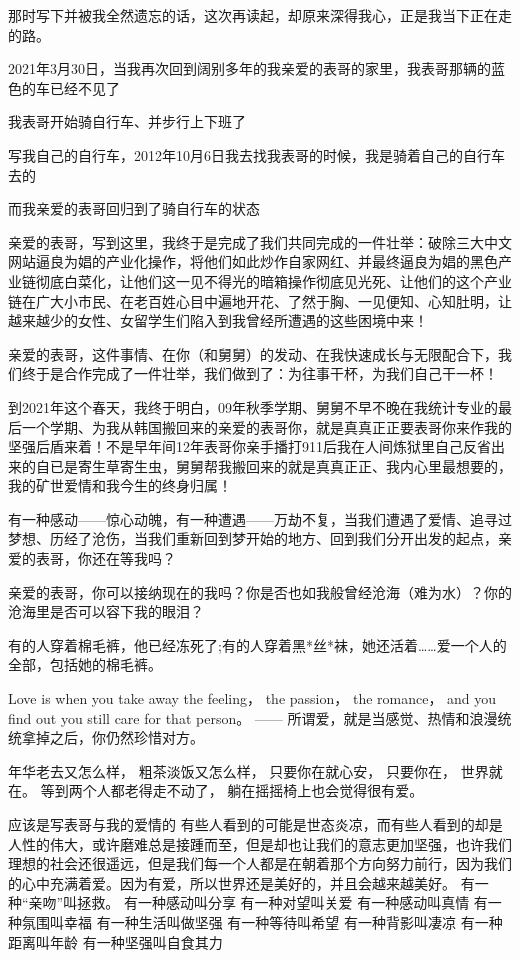 \documentclass[9pt, b5paper]{article}
\begin{document}
那时写下并被我全然遗忘的话，这次再读起，却原来深得我心，正是我当下正在走的路。 

2021年3月30日，当我再次回到阔别多年的我亲爱的表哥的家里，我表哥那辆的蓝色的车已经不见了

我表哥开始骑自行车、并步行上下班了

写我自己的自行车，2012年10月6日我去找我表哥的时候，我是骑着自己的自行车去的

而我亲爱的表哥回归到了骑自行车的状态

亲爱的表哥，写到这里，我终于是完成了我们共同完成的一件壮举：破除三大中文网站逼良为娼的产业化操作，将他们如此炒作自家网红、并最终逼良为娼的黑色产业链彻底白菜化，让他们这一见不得光的暗箱操作彻底见光死、让他们的这个产业链在广大小市民、在老百姓心目中遍地开花、了然于胸、一见便知、心知肚明，让越来越少的女性、女留学生们陷入到我曾经所遭遇的这些困境中来！

亲爱的表哥，这件事情、在你（和舅舅）的发动、在我快速成长与无限配合下，我们终于是合作完成了一件壮举，我们做到了：为往事干杯，为我们自己干一杯！

到2021年这个春天，我终于明白，09年秋季学期、舅舅不早不晚在我统计专业的最后一个学期、为我从韩国搬回来的亲爱的表哥你，就是真真正正要表哥你来作我的坚强后盾来着！不是早年间12年表哥你亲手播打911后我在人间炼狱里自己反省出来的自已是寄生草寄生虫，舅舅帮我搬回来的就是真真正正、我内心里最想要的，我的矿世爱情和我今生的终身归属！

有一种感动——惊心动魄，有一种遭遇——万劫不复，当我们遭遇了爱情、追寻过梦想、历经了沧伤，当我们重新回到梦开始的地方、回到我们分开出发的起点，亲爱的表哥，你还在等我吗？

亲爱的表哥，你可以接纳现在的我吗？你是否也如我般曾经沧海（难为水）？你的沧海里是否可以容下我的眼泪？

有的人穿着棉毛裤，他已经冻死了;有的人穿着黑*丝*袜，她还活着……爱一个人的全部，包括她的棉毛裤。

Love is when you take away the feeling， the passion， the romance， and you find out you still care for that person。 —— 所谓爱，就是当感觉、热情和浪漫统统拿掉之后，你仍然珍惜对方。

年华老去又怎么样， 粗茶淡饭又怎么样， 只要你在就心安， 只要你在， 世界就在。 等到两个人都老得走不动了， 躺在摇摇椅上也会觉得很有爱。

应该是写表哥与我的爱情的
有些人看到的可能是世态炎凉，而有些人看到的却是人性的伟大，或许磨难总是接踵而至，但是却也让我们的意志更加坚强，也许我们理想的社会还很遥远，但是我们每一个人都是在朝着那个方向努力前行，因为我们的心中充满着爱。因为有爱，所以世界还是美好的，并且会越来越美好。 
有一种“亲吻”叫拯救。
有一种感动叫分享
有一种对望叫关爱
有一种感动叫真情
有一种氛围叫幸福
有一种生活叫做坚强
有一种等待叫希望
有一种背影叫凄凉
有一种距离叫年龄
有一种坚强叫自食其力
\end{document}
